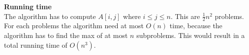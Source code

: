 \documentclass[a4paper,twoside,11pt]{article}
\begin{document}
\textbf{Running time} \\ 
 The algorithm has to compute $ A[i,j] $ where $ i \leq j \leq n$. 
 This are $ \frac{1}{2}n^2$ problems.
 For each problems the algorithm need at most $O(n)$ time, because the algorithm has to find the max of at most $n$ subproblems. 
 This would result in a total running time of $O(n^3)$.
\end{document}
